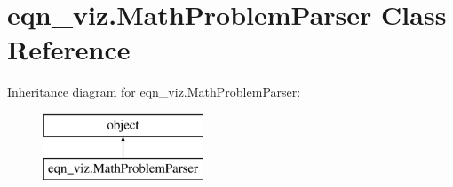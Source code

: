 \hypertarget{classeqn__viz_1_1_math_problem_parser}{}\section{eqn\+\_\+viz.\+Math\+Problem\+Parser Class Reference}
\label{classeqn__viz_1_1_math_problem_parser}
Inheritance diagram for eqn\+\_\+viz.\+Math\+Problem\+Parser\+:\begin{figure}[H]
\begin{center}
\leavevmode
\includegraphics[height=2.000000cm]{classeqn__viz_1_1_math_problem_parser}
\end{center}
\end{figure}
